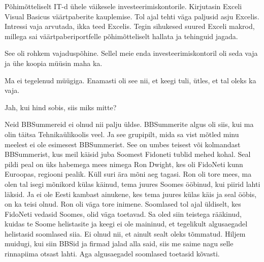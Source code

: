 
Põhimõtteliselt IT-d ühele väikesele investeerimiskontorile. Kirjutasin Exceli Visual Basicus väärtpaberite kauplemise. Tol ajal tehti väga paljusid asju Excelis. Intressi vaja arvutada, ikka teed Excelis. Tegin sihukesed suured Exceli makrod, millega sai väärtpaberiportfelle põhimõtteliselt hallata ja tehinguid jagada. 


See oli rohkem vajaduspõhine. Sellel meie enda investeerimiskontoril oli seda vaja ja ühe koopia müüsin maha ka. 


Ma ei  tegelenud müügiga. Enamasti oli see nii, et keegi tuli, ütles, et tal oleks ka vaja. 


Jah, kui hind sobis, siis miks mitte?


Neid BBSummereid ei olnud nii palju üldse. BBSummerite algus  oli siis, kui ma olin täitsa Tehnikaülikoolis veel. Ja see grupipilt, mida sa vist mõtled minu  meelest ei ole esimesest BBSummerist. See on umbes teisest või kolmandast BBSummerist, kus meil käisid juba Soomest Fidoneti tublid mehed kohal. Seal pildi peal on üks habemega mees nimega Ron Dwight, kes oli FidoNeti kunn Euroopas, regiooni pealik. Küll suri ära mõni aeg tagasi. Ron oli tore mees, ma olen tal isegi mõnikord külas käinud, tema juures Soomes ööbinud, kui piirid lahti läksid. Ja ei ole Eesti kambast ainukene, kes tema juures külas käis ja seal ööbis, on ka teisi olnud. Ron oli väga tore inimene. Soomlased tol ajal üldiselt, kes FidoNeti vedasid Soomes, olid väga toetavad. Sa oled siin teistega rääkinud, kuidas te Soome helistasite ja keegi ei ole maininud, et tegelikult algusaegadel helistasid soomlased siia. Ei olnud nii, et ainult sealt oleks tõmmatud. Hiljem muidugi, kui siin BBSid ja firmad jalad alla said, siis me saime nagu selle rinnapiima otsast lahti. Aga algusaegadel soomlased toetasid kõvasti. 


